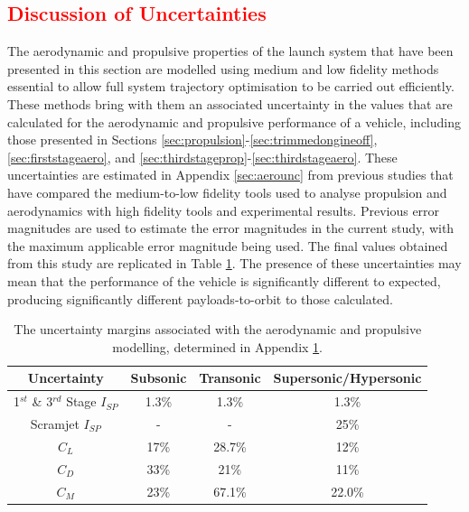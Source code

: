 \textcolor{red}{
	\section{Discussion of Uncertainties}\label{sec:unc}
}


The aerodynamic and propulsive properties of the launch system that have been presented in this section are modelled using medium and low fidelity methods essential to allow full system trajectory optimisation to be carried out efficiently. These methods bring with them an associated uncertainty in the values that are calculated for the aerodynamic and propulsive performance of a vehicle, including those presented in Sections \ref{sec:propulsion}-\ref{sec:trimmedongineoff}, \ref{sec:firststageaero}, and \ref{sec:thirdstageprop}-\ref{sec:thirdstageaero}. These uncertainties are estimated in Appendix \ref{sec:aerounc} from previous studies that have compared the medium-to-low fidelity tools used to analyse propulsion and aerodynamics with high fidelity tools and experimental results. Previous error magnitudes are used to estimate the error magnitudes in the current study, with the maximum applicable error magnitude being used. The final values obtained from this study are replicated in Table \ref{tab:AppendixUncertaintyCopy}. The presence of these uncertainties may mean that the performance of the vehicle is significantly different to expected, producing significantly different payloads-to-orbit to those calculated. 

\begin{table}[ht]
	\centering
	\begin{tabular}{|c|c|c|c|}
		\hline  Uncertainty & Subsonic & Transonic  & Supersonic/Hypersonic \\ 
		\hline  1$^{st}$ \& 3$^{rd}$ Stage $I_{SP}$ & 1.3\% & 1.3\% &  1.3\% \\ 
		\hline  Scramjet $I_{SP}$ & - & - &  25\% \\ 
		\hline   $C_L$ & 17\% & 28.7\% & 12\% \\  
		\hline   $C_D$ & 33\% & 21\% & 11\% \\  
		\hline   $C_M$  & 23\% & 67.1\% &  22.0\% \\ 
		\hline 
	\end{tabular}
	\caption{The uncertainty margins associated with the aerodynamic and propulsive modelling, determined in Appendix \ref{tab:AppendixUncertaintyCopy}.}
	\label{tab:AppendixUncertaintyCopy}
\end{table}


